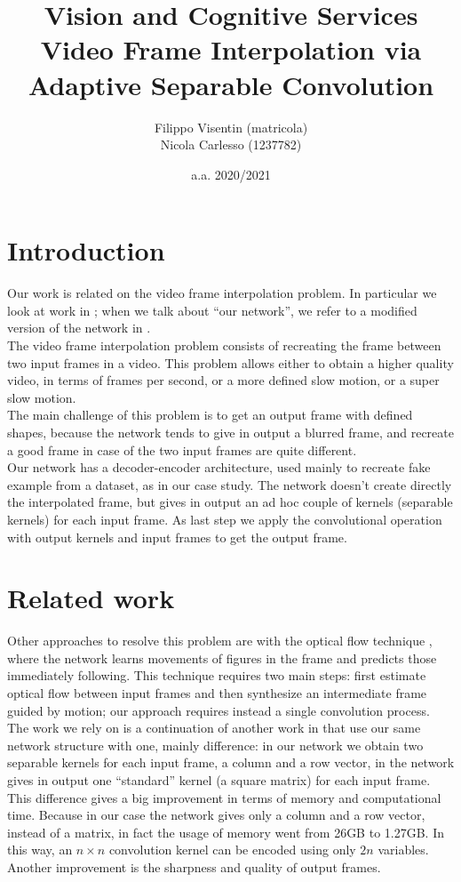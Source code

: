 \documentclass[11pt, a4paper]{article}
\title{Vision and Cognitive Services\\
\large Video Frame Interpolation via Adaptive Separable Convolution}
\author{Filippo Visentin (matricola)\\
Nicola Carlesso (1237782)}
\date{a.a. 2020/2021}
\begin{document}
	\maketitle
	\clearpage
	
	\tableofcontents
	\clearpage
	
	\section{Introduction}
	Our work is related on the video frame interpolation problem. In particular we look at work in \cite{mainpaper}; when we talk about ``our network'', we refer to a modified version of the network in \cite{mainpaper}.\\
	The video frame interpolation problem consists of recreating the frame between two input frames in a video. This problem allows either to obtain a higher quality video, in terms of frames per second, or a more defined slow motion, or a super slow motion.\\
	The main challenge of this problem is to get an output frame with defined shapes, because the network tends to give in output a blurred frame, and recreate a good frame in case of the two input frames are quite different.\\
	Our network has a decoder-encoder architecture, used mainly to recreate fake example from a dataset, as in our case study. The network doesn't create directly the interpolated frame, but gives in output an ad hoc couple of kernels (separable kernels) for each input frame. As last step we apply the convolutional operation with output kernels and input frames to get the output frame. 
	
	\section{Related work}
	Other approaches to resolve this problem are with the optical flow technique \cite{optical_flow}, where the network learns movements of figures in the frame and predicts those immediately following. This technique requires two main steps: first estimate optical flow between input frames and then synthesize an intermediate frame guided by motion; our approach requires instead a single convolution process.\\
	The work we rely on is a continuation of another work in \cite{previous_work} that use our same network structure with one, mainly difference: in our network we obtain two separable kernels for each input frame, a column and a row vector, in \cite{previous_work} the network gives in output one ``standard'' kernel (a square matrix) for each input frame. This difference gives a big improvement in terms of memory and computational time. Because in our case the network gives only a column and a row vector, instead of a matrix, in fact the usage of memory went from 26GB to 1.27GB.  In this way, an $n\times n$ convolution kernel can be encoded using only $2n$ variables.\\
	Another improvement is the sharpness and quality of output frames.
	
\end{document}
